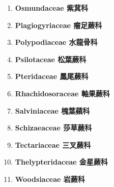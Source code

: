 \begin{enumerate}
        
      \item[] \begin{small}\textbf{Osmundaceae 紫萁科} \end{small}
        
      \item[] \begin{small}\textbf{Plagiogyriaceae 瘤足蕨科} \end{small}
        
      \item[] \begin{small}\textbf{Polypodiaceae 水龍骨科} \end{small}
        
      \item[] \begin{small}\textbf{Psilotaceae 松葉蕨科} \end{small}
        
      \item[] \begin{small}\textbf{Pteridaceae 鳳尾蕨科} \end{small}
        
      \item[] \begin{small}\textbf{Rhachidosoraceae 軸果蕨科} \end{small}
        
      \item[] \begin{small}\textbf{Salviniaceae 槐葉蘋科} \end{small}
        
      \item[] \begin{small}\textbf{Schizaeaceae 莎草蕨科} \end{small}
        
      \item[] \begin{small}\textbf{Tectariaceae 三叉蕨科} \end{small}
        
      \item[] \begin{small}\textbf{Thelypteridaceae 金星蕨科} \end{small}
        
      \item[] \begin{small}\textbf{Woodsiaceae 岩蕨科} \end{small}
        
    \end{enumerate}
